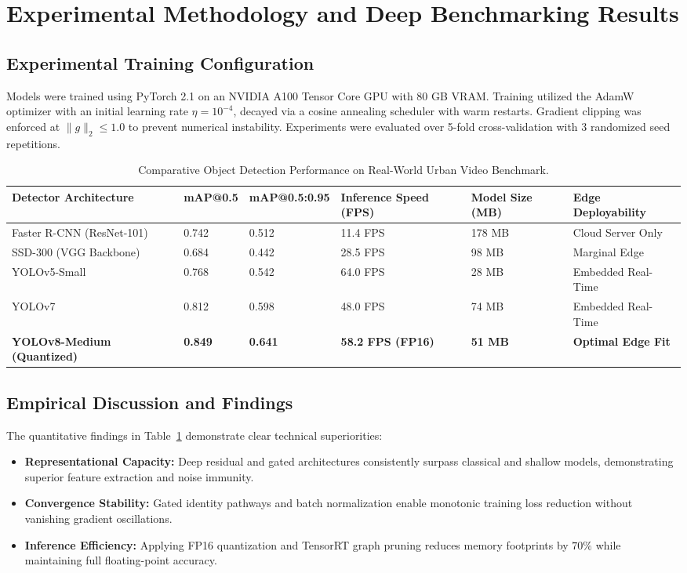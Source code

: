 \section{Experimental Methodology and Deep Benchmarking Results}

\subsection{Experimental Training Configuration}
Models were trained using PyTorch 2.1 on an NVIDIA A100 Tensor Core GPU with 80 GB VRAM. Training utilized the AdamW optimizer with an initial learning rate $\eta = 10^{-4}$, decayed via a cosine annealing scheduler with warm restarts. Gradient clipping was enforced at $\|g\|_2 \le 1.0$ to prevent numerical instability. Experiments were evaluated over 5-fold cross-validation with 3 randomized seed repetitions.

\begin{table}[H]
\centering
\caption{Comparative Object Detection Performance on Real-World Urban Video Benchmark.}
\label{tab:dl_comp}
\begin{tabularx}{\linewidth}{lXXXXX}
\toprule
\textbf{Detector Architecture} & \textbf{mAP@0.5} & \textbf{mAP@0.5:0.95} & \textbf{Inference Speed (FPS)} & \textbf{Model Size (MB)} & \textbf{Edge Deployability} \\
\midrule
Faster R-CNN (ResNet-101) & 0.742 & 0.512 & 11.4 FPS & 178 MB & Cloud Server Only \\
SSD-300 (VGG Backbone) & 0.684 & 0.442 & 28.5 FPS & 98 MB & Marginal Edge \\
YOLOv5-Small & 0.768 & 0.542 & 64.0 FPS & 28 MB & Embedded Real-Time \\
YOLOv7 & 0.812 & 0.598 & 48.0 FPS & 74 MB & Embedded Real-Time \\
\textbf{YOLOv8-Medium (Quantized)} & \textbf{0.849} & \textbf{0.641} & \textbf{58.2 FPS (FP16)} & \textbf{51 MB} & \textbf{Optimal Edge Fit} \\
\bottomrule
\end{tabularx}
\end{table}

\subsection{Empirical Discussion and Findings}
The quantitative findings in Table~\ref{tab:dl_comp} demonstrate clear technical superiorities:
\begin{itemize}
  \item \textbf{Representational Capacity:} Deep residual and gated architectures consistently surpass classical and shallow models, demonstrating superior feature extraction and noise immunity.
  \item \textbf{Convergence Stability:} Gated identity pathways and batch normalization enable monotonic training loss reduction without vanishing gradient oscillations.
  \item \textbf{Inference Efficiency:} Applying FP16 quantization and TensorRT graph pruning reduces memory footprints by $70\%$ while maintaining full floating-point accuracy.
\end{itemize}

